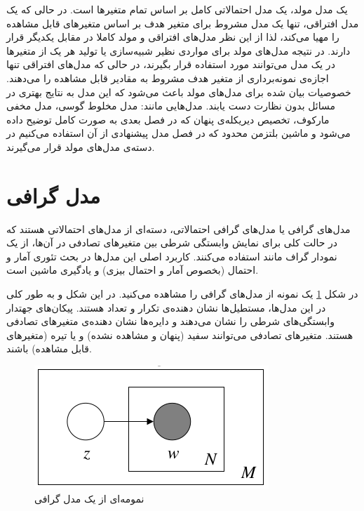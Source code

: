 	یک مدل مولد، یک مدل احتمالاتی کامل بر اساس تمام متغیر‌ها است. در حالی‌ که یک مدل افتراقی، تنها یک مدل مشروط برای متغیر هدف
	بر اساس متغیر‌های قابل مشاهده را مهیا می‌‌کند، لذا از این نظر مدل‌های افتراقی و مولد کاملا در مقابل یکدیگر قرار دارند. در نتیجه مدل‌های مولد برای مواردی نظیر شبیه‌سازی یا تولید هر یک از متغیر‌ها در یک مدل می‌‌توانند مورد استفاده قرار بگیرند، در حالی‌ که مدل‌های افتراقی تنها اجازه‌ی نمونه‌برداری
	از متغیر هدف مشروط به مقادیر قابل مشاهده را می‌‌دهند. خصوصیات بیان شده برای مدل‌های مولد باعث می‌‌شود که این مدل به نتایج بهتری در مسائل بدون نظارت  دست یابند. مدل‌هایی مانند: مدل مخلوط گوسی، مدل مخفی‌ مارکوف، تخصیص دیریکله‌ی پنهان
	که در فصل بعدی به صورت کامل توضیح داده می‌‌شود و ماشین بلتزمن محدود
	که در فصل مدل پیشنهادی از آن استفاده می‌کنیم در دسته‌ی مدل‌های مولد قرار می‌‌گیرند.
\section{مدل گرافی}
\label{chap2sec4}
مدل‌های گرافی
یا مدل‌های گرافی احتمالاتی، دسته‌ای از مدل‌های احتمالاتی هستند که در حالت کلی‌ برای نمایش وابستگی شرطی بین متغیر‌های تصادفی در آن‌ها، از یک نمودار گراف مانند استفاده می‌‌کنند. کاربرد اصلی‌ این مدل‌ها در بحث تئوری آمار و احتمال (بخصوص آمار و احتمال بیزی) و یادگیری ماشین است.

در شکل
\ref{chap2-fig4}
یک نمونه از مدل‌های گرافی‌ را مشاهده می‌‌کنید. در این شکل و به طور کلی‌ در این مدل‌ها، مستطیل‌ها نشان دهنده‌ی تکرار و تعداد هستند. پیکان‌های جهتدار وابستگی‌های شرطی را نشان می‌‌دهند و دایره‌ها نشان دهنده‌ی متغیر‌های تصادفی هستند. متغیر‌های تصادفی می‌‌توانند سفید‌ (پنهان و مشاهده نشده) و یا تیره (متغیر‌های قابل مشاهده) باشند.
\begin{figure}[!t]
	\centering
	\includegraphics[scale=0.5]{chap2-img/graphicalmodel}
	\caption{نمومه‌ای از یک مدل گرافی \cite{blei2003latent}}
	\label{chap2-fig4}
\end{figure}

